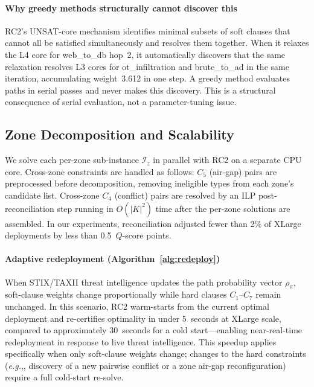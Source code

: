 \documentclass[journal]{IEEEtran}
\newcommand{\qscore}{$Q$-score}
\newcommand{\eg}{\emph{e.g.},}
\begin{document}
\paragraph{Why greedy methods structurally cannot discover this}
RC2's UNSAT-core mechanism identifies minimal subsets of soft clauses
that cannot all be satisfied simultaneously and resolves them
together. When it relaxes the L4 core for web\_to\_db hop~2, it
automatically discovers that the same relaxation resolves L3 cores
for ot\_infiltration and brute\_to\_ad in the same iteration,
accumulating weight~3.612 in one step. A greedy method evaluates
paths in serial passes and never makes this discovery. This is a
structural consequence of serial evaluation, not a parameter-tuning
issue.

\subsection{Zone Decomposition and Scalability}
\label{sec:solver}

We solve each per-zone sub-instance $\mathcal{I}_z$ in parallel
with RC2 on a separate CPU core. Cross-zone constraints are handled
as follows: $C_5$ (air-gap) pairs are preprocessed before
decomposition, removing ineligible types from each zone's candidate
list. Cross-zone $C_4$ (conflict) pairs are resolved by an ILP
post-reconciliation step running in $O(|K|^2)$ time after the
per-zone solutions are assembled. In our experiments, reconciliation
adjusted fewer than 2\% of XLarge deployments by less than
0.5~\qscore{} points.

\paragraph{Adaptive redeployment (Algorithm~\ref{alg:redeploy})}
When STIX/TAXII threat intelligence updates the path probability
vector $\rho_\pi$, soft-clause weights change proportionally while
hard clauses $C_1$--$C_7$ remain unchanged. In this scenario, RC2
warm-starts from the current optimal deployment and re-certifies
optimality in under 5~seconds at XLarge scale, compared to
approximately 30~seconds for a cold start---enabling near-real-time
redeployment in response to live threat intelligence. This speedup
applies specifically when only soft-clause weights change; changes
to the hard constraints (\eg, discovery of a new pairwise conflict
or a zone air-gap reconfiguration) require a full cold-start
re-solve.
\end{document}
